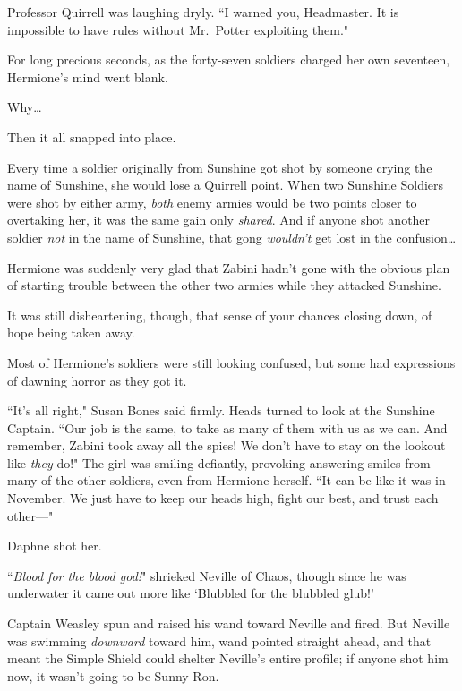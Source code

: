 Professor Quirrell was laughing dryly. ``I warned you, Headmaster. It is impossible to have rules without Mr.~Potter exploiting them."

\later

For long precious seconds, as the forty-seven soldiers charged her own seventeen, Hermione's mind went blank.

Why{\ldots}

Then it all snapped into place.

Every time a soldier originally from Sunshine got shot by someone crying the name of Sunshine, she would lose a Quirrell point. When two Sunshine Soldiers were shot by either army, \emph{both} enemy armies would be two points closer to overtaking her, it was the same gain only \emph{shared}. And if anyone shot another soldier \emph{not} in the name of Sunshine, that gong \emph{wouldn't} get lost in the confusion{\ldots}

Hermione was suddenly very glad that Zabini hadn't gone with the obvious plan of starting trouble between the other two armies while they attacked Sunshine.

It was still disheartening, though, that sense of your chances closing down, of hope being taken away.

Most of Hermione's soldiers were still looking confused, but some had expressions of dawning horror as they got it.

``It's all right," Susan Bones said firmly. Heads turned to look at the Sunshine Captain. ``Our job is the same, to take as many of them with us as we can. And remember, Zabini took away all the spies! We don't have to stay on the lookout like \emph{they} do!" The girl was smiling defiantly, provoking answering smiles from many of the other soldiers, even from Hermione herself. ``It can be like it was in November. We just have to keep our heads high, fight our best, and trust each other—"

Daphne shot her.

\later

``\emph{Blood for the blood god!}" shrieked Neville of Chaos, though since he was underwater it came out more like `Blubbled for the blubbled glub!'

Captain Weasley spun and raised his wand toward Neville and fired. But Neville was swimming \emph{downward} toward him, wand pointed straight ahead, and that meant the Simple Shield could shelter Neville's entire profile; if anyone shot him now, it wasn't going to be Sunny Ron.

